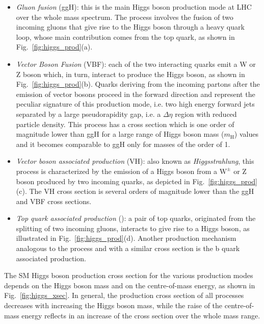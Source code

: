 \begin{itemize}
\item \emph{Gluon fusion} (ggH): this is the main Higgs boson production mode at LHC over the whole mass spectrum. The process involves the fusion of two incoming gluons that give rise to the Higgs boson through a heavy quark loop, whose main contribution comes from the top quark, as shown in Fig.~\ref{fig:higgs_prod}(a).

\item \emph{Vector Boson Fusion} (VBF): each of the two interacting quarks emit a W or Z boson which, in turn, interact to produce the Higgs boson, as shown in Fig.~\ref{fig:higgs_prod}(b). Quarks deriving from the incoming partons after the emission of vector bosons proceed in the forward direction and represent the peculiar signature of this production mode, i.e. two high energy forward jets separated by a large pseudorapidity gap, i.e. a $\Delta\eta$ region with reduced particle density. This process has a cross section which is one order of magnitude lower than ggH for a large range of Higgs boson mass ($m_\mathrm{H}$) values and it becomes comparable to ggH only for masses of the order of 1\TeV.

\item \emph{Vector boson associated production} (VH): also known as \emph{Higgsstrahlung}, this process is characterized by the emission of a Higgs boson from a $\mathrm{W}^\pm$ or Z boson produced by two incoming quarks, as depicted in Fig.~\ref{fig:higgs_prod}(c). The VH cross section is several orders of magnitude lower than the ggH and VBF cross sections.

\item \emph{Top quark associated production} (\ttH): a pair of top quarks, originated from the splitting of two incoming gluons, interacts to give rise to a Higgs boson, as illustrated in Fig.~\ref{fig:higgs_prod}(d). Another production mechanism analogous to the \ttH process and with a similar cross section is the b quark associated production.
\end{itemize}

The SM Higgs boson production cross section for the various production modes depends on the Higgs boson mass and on the centre-of-mass energy, as shown in Fig.~\ref{fig:higgs_xsec}. In general, the production cross section of all processes decreases with increasing the Higgs boson mass, while the raise of the centre-of-mass energy reflects in an increase of the cross section over the whole mass range.

